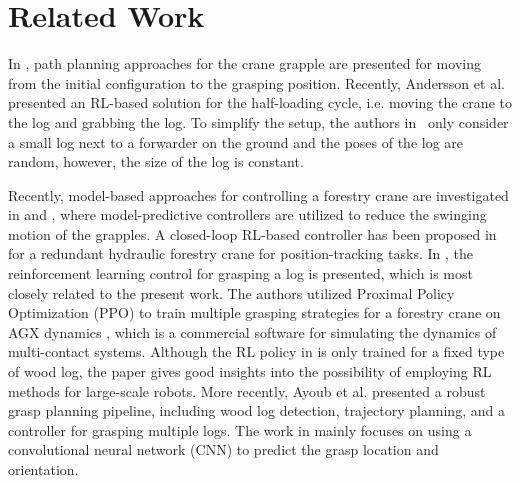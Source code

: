 \section{Related Work}
\label{Sec:rw}

In \cite{ortiz2014increasing}, path planning approaches for the crane grapple are presented for moving from the initial configuration to the grasping position.  
Recently, Andersson et al. \cite{andersson2021reinforcement} presented an RL-based solution for the half-loading cycle, i.e. moving the crane to the log and grabbing the log. To simplify the setup, the authors in~\cite{andersson2021reinforcement} only consider a small log next to a forwarder on the ground and the poses of the log are random, however, the size of the log is constant. 

Recently, model-based approaches for controlling a forestry crane are investigated in  \cite{kalmari2014nonlinear} and \cite{hera2015model}, where model-predictive controllers are utilized to reduce the swinging motion of the grapples. A closed-loop RL-based controller has been proposed in \cite{dhakate2022autonomous} for a redundant hydraulic forestry crane for position-tracking tasks. In \cite{andersson2021reinforcement}, the reinforcement learning control for grasping a log is presented, which is most closely related to the present work. The authors utilized Proximal Policy Optimization (PPO) \cite{schulman2017proximal} to train multiple grasping strategies for a forestry crane on AGX dynamics \cite{algoryx}, which is a commercial software for simulating the dynamics of multi-contact systems. 
Although the RL policy in \cite{andersson2021reinforcement} is only trained for a fixed type of wood log, the paper gives good insights into the possibility of employing RL methods for large-scale robots. More recently, Ayoub et al. \cite{ayoub2023grasp} presented a robust grasp planning pipeline, including wood log detection, trajectory planning, and a controller for grasping multiple logs. The work in \cite{ayoub2023grasp} mainly focuses on using a convolutional neural network (CNN) to predict the grasp location and orientation.